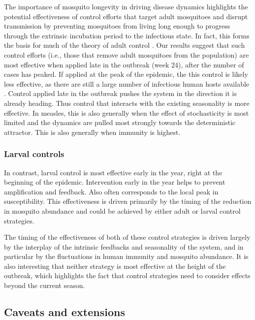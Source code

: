 \documentclass[10pt,letterpaper]{article}
\begin{document}
The importance of mosquito longevity in driving disease dynamics highlights the potential effectiveness of control efforts that target adult mosquitoes and disrupt transmission by preventing mosquitoes from living long enough to progress through the extrinsic incubation period to the infectious state.
In fact, this forms the basis for much of the theory of adult control \cite{Burattini2008, Morrison2008, Smith2012}.
Our results suggest that such control efforts (i.e., those that remove adult mosquitoes from the population) are most effective when applied late in the outbreak (week 24), after the number of cases has peaked.
If applied at the peak of the epidemic, the this control is likely less effective, as there are still a large number of infectious human hosts available \cite{Newton1992, Burattini2008}.
Control applied late in the outbreak pushes the system in the direction it is already heading.
Thus control that interacts with the existing seasonality is more effective.
In measles, this is also generally when the effect of stochasticity is most limited and the dynamics are pulled most strongly towards the deterministic attractor.
This is also generally when immunity is highest.

\subsubsection*{Larval controls}

In contrast, larval control is most effective early in the year, right at the beginning of the epidemic.
Intervention early in the year helps to prevent amplification and feedback.
Also often corresponds to the local peak in susceptibility.
This effectiveness is driven primarily by the timing of the reduction in mosquito abundance and could be achieved by either adult or larval control strategies.

The timing of the effectiveness of both of these control strategies is driven largely by the interplay of the intrinsic feedbacks and seasonality of the system, and in particular by the fluctuations in human immunity and mosquito abundance.
It is also interesting that neither strategy is most effective at the height of the outbreak, which highlights the fact that control strategies need to consider effects beyond the current season.

\subsection*{Caveats and extensions}
\end{document}

